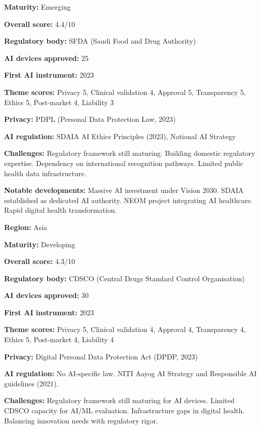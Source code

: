 \noindent\textbf{Maturity:} Emerging\par
\noindent\textbf{Overall score:} 4.4/10\par
\noindent\textbf{Regulatory body:} SFDA (Saudi Food and Drug Authority)\par
\noindent\textbf{AI devices approved:} 25\par
\noindent\textbf{First AI instrument:} 2023\par
\noindent\textbf{Theme scores:} Privacy 5, Clinical validation 4, Approval 5, Transparency 5, Ethics 5, Post-market 4, Liability 3\par
\noindent\textbf{Privacy:} PDPL (Personal Data Protection Law, 2023)\par
\noindent\textbf{AI regulation:} SDAIA AI Ethics Principles (2023), National AI Strategy\par
\noindent\textbf{Challenges:} Regulatory framework still maturing. Building domestic regulatory expertise. Dependency on international recognition pathways. Limited public health data infrastructure.\par
\noindent\textbf{Notable developments:} Massive AI investment under Vision 2030. SDAIA established as dedicated AI authority. NEOM project integrating AI healthcare. Rapid digital health transformation.\par
\vspace{0.55em}
\par
\vspace{0.15em}
\noindent\textbf{Region:} Asia\par
\noindent\textbf{Maturity:} Developing\par
\noindent\textbf{Overall score:} 4.3/10\par
\noindent\textbf{Regulatory body:} CDSCO (Central Drugs Standard Control Organisation)\par
\noindent\textbf{AI devices approved:} 30\par
\noindent\textbf{First AI instrument:} 2023\par
\noindent\textbf{Theme scores:} Privacy 5, Clinical validation 4, Approval 4, Transparency 4, Ethics 5, Post-market 4, Liability 4\par
\noindent\textbf{Privacy:} Digital Personal Data Protection Act (DPDP, 2023)\par
\noindent\textbf{AI regulation:} No AI-specific law. NITI Aayog AI Strategy and Responsible AI guidelines (2021).\par
\noindent\textbf{Challenges:} Regulatory framework still maturing for AI devices. Limited CDSCO capacity for AI/ML evaluation. Infrastructure gaps in digital health. Balancing innovation needs with regulatory rigor.\par
